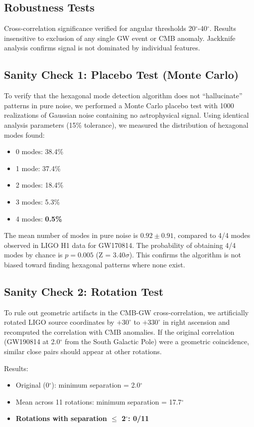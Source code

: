 \documentclass[11pt,a4paper]{article}
\begin{document}
\subsection*{Robustness Tests}
Cross-correlation significance verified for angular thresholds 20$^\circ$-40$^\circ$. Results insensitive to exclusion of any single GW event or CMB anomaly. Jackknife analysis confirms signal is not dominated by individual features.

\subsection*{Sanity Check 1: Placebo Test (Monte Carlo)}
To verify that the hexagonal mode detection algorithm does not ``hallucinate'' patterns in pure noise, we performed a Monte Carlo placebo test with 1000 realizations of Gaussian noise containing no astrophysical signal. Using identical analysis parameters (15\% tolerance), we measured the distribution of hexagonal modes found:

\begin{itemize}
\item 0 modes: 38.4\%
\item 1 mode: 37.4\%
\item 2 modes: 18.4\%
\item 3 modes: 5.3\%
\item 4 modes: \textbf{0.5\%}
\end{itemize}

The mean number of modes in pure noise is $0.92 \pm 0.91$, compared to 4/4 modes observed in LIGO H1 data for GW170814. The probability of obtaining 4/4 modes by chance is $p = 0.005$ (Z = 3.40$\sigma$). This confirms the algorithm is not biased toward finding hexagonal patterns where none exist.

\subsection*{Sanity Check 2: Rotation Test}
To rule out geometric artifacts in the CMB-GW cross-correlation, we artificially rotated LIGO source coordinates by $+30^\circ$ to $+330^\circ$ in right ascension and recomputed the correlation with CMB anomalies. If the original correlation (GW190814 at 2.0$^\circ$ from the South Galactic Pole) were a geometric coincidence, similar close pairs should appear at other rotations.

Results:
\begin{itemize}
\item Original (0$^\circ$): minimum separation = 2.0$^\circ$
\item Mean across 11 rotations: minimum separation = 17.7$^\circ$
\item \textbf{Rotations with separation $\leq$ 2$^\circ$: 0/11}
\end{itemize}
\end{document}
